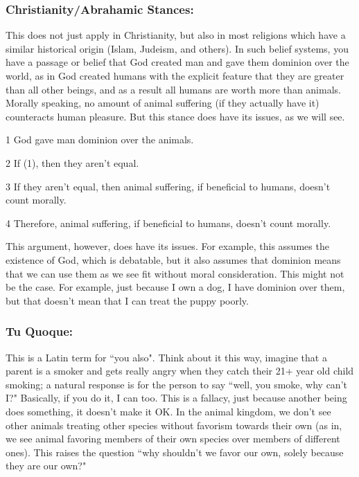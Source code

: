 \subsubsection{Christianity/Abrahamic Stances:}

This does not just apply in Christianity, but also in most religions which have a similar historical origin (Islam, Judeism, and others). In such belief systems, you have a passage or belief that God created man and gave them dominion over the world, as in God created humans with the explicit feature that they are greater than all other beings, and as a result all humans are worth more than animals. Morally speaking, no amount of animal suffering (if they actually have it) counteracts human pleasure. But this stance does have its issues, as we will see.
\begin{earg}
    \item[1] God gave man dominion over the animals.
    \item[2] If (1), then they aren't equal.
    \item[3] If they aren't equal, then animal suffering, if beneficial to humans, doesn't count morally.
    \item[4] Therefore, animal suffering, if beneficial to humans, doesn't count morally. 
\end{earg}
This argument, however, does have its issues. For example, this assumes the existence of God, which is debatable, but it also assumes that dominion means that we can use them as we see fit without moral consideration. This might not be the case. For example, just because I own a dog, I have dominion over them, but that doesn't mean that I can treat the puppy poorly.  
\subsubsection{Tu Quoque:}

This is a Latin term for ``you also". Think about it this way, imagine that a parent is a smoker and gets really angry when they catch their 21+ year old child smoking; a natural response is for the person to say ``well, you smoke, why can't I?" Basically, if you do it, I can too. This is a fallacy, just because another being does something, it doesn't make it OK. In the animal kingdom, we don't see other animals treating other species without favorism towards their own (as in, we see animal favoring members of their own species over members of different ones). This raises the question ``why shouldn't we favor our own, solely because they are our own?" 

